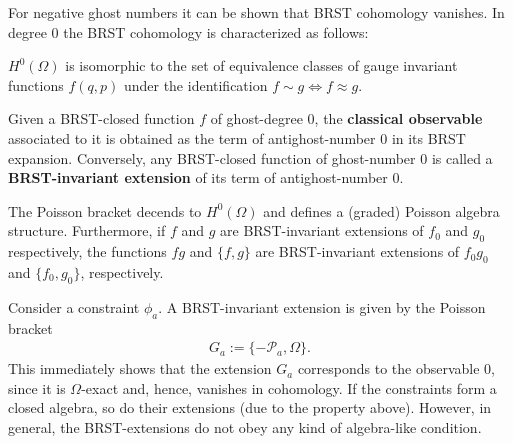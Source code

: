     For negative ghost numbers it can be shown that BRST cohomology vanishes. In degree 0 the BRST cohomology is characterized as follows:
    \begin{property}\label{lagrange:brst_0}
        $H^0(\Omega)$ is isomorphic to the set of equivalence classes of gauge invariant functions $f(q,p)$ under the identification $f\sim g\iff f\approx g$.

        Given a BRST-closed function $f$ of ghost-degree 0, the \textbf{classical observable} associated to it is obtained as the term of antighost-number 0 in its BRST expansion. Conversely, any BRST-closed function of ghost-number 0 is called a \textbf{BRST-invariant extension} of its term of antighost-number 0.
    \end{property}
    \begin{property}
        The Poisson bracket decends to $H^0(\Omega)$ and defines a (graded) Poisson algebra structure. Furthermore, if $f$ and $g$ are BRST-invariant extensions of $f_0$ and $g_0$ respectively, the functions $fg$ and $\{f,g\}$ are BRST-invariant extensions of $f_0g_0$ and $\{f_0,g_0\}$, respectively.
    \end{property}

    \begin{example}
        Consider a constraint $\phi_a$. A BRST-invariant extension is given by the Poisson bracket
        \begin{gather}
            G_a := \{-\mathcal{P}_a,\Omega\}.
        \end{gather}
        This immediately shows that the extension $G_a$ corresponds to the observable 0, since it is $\Omega$-exact and, hence, vanishes in cohomology. If the constraints form a closed algebra, so do their extensions (due to the property above). However, in general, the BRST-extensions do not obey any kind of algebra-like condition.
    \end{example}



